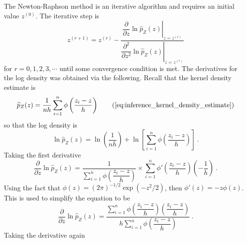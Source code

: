 The Newton-Raphson method is an iterative algorithm and requires an initial value $z^{(0)}$. The iterative step is
\begin{equation}
  z^{(r+1)} =
  z^{(r)}
  -\dfrac{
    \left.
      \dfrac{
        \partial
      }
      {
        \partial z
      }
      \ln\widehat{p}_Z(z)
    \right|_{z = z^{(r)}}
  }
  {
    \left.
      \dfrac{
        \partial^2
      }
      {
        \partial z^2
      }
      \ln\widehat{p}_Z(z)
    \right|_{z = z^{(r)}}
  } 
\end{equation}
for $r=0,1,2,3,\cdots$ until some convergence condition is met. The derivatives for the log density was obtained via the following. Recall that the kernel density estimate is
\begin{equation}
  \widehat{p}_Z(z)=
  \frac{1}{nh}
  \sum_{i=1}^n\phi\left(
    \dfrac{z_i-z}{h}
  \right)
  \tag{\ref{eq:inference_kernel_density_estimate}}
\end{equation}
so that the log density is
\begin{equation}
  \ln\widehat{p}_Z(z)=
  \ln\left(
    \dfrac{1}{nh}
  \right)
  +
  \ln\left[
    \sum_{i=1}^n
    \phi\left(
      \dfrac{
        z_i - z
      }
      {
        h
      }
    \right)
  \right]
  \ .
\end{equation}
Taking the first derivative
\begin{equation}
  \dfrac{
    \partial
  }
  {
    \partial z
  }
  \ln\widehat{p}_Z(z)
  =
  \dfrac{
    1
  }
  {
    \sum_{i=1}^n
    \phi\left(
      \dfrac{
        z_i - z
      }
      {
        h
      }
    \right)
  }
  \times
  \sum_{i=1}^n
  \phi'\left(
    \dfrac{
      z_i - z
    }
    {
      h
    }
  \right)
  \left(
    -\dfrac{
      1
    }
    {
      h
    }
  \right)
  \ .
\end{equation}
Using the fact that $\phi(z)=(2\pi)^{-1/2}\exp(-z^2/2)$, then $\phi'(z)=-z\phi(z)$. This is used to simplify the equation to be
\begin{equation}
  \dfrac{
    \partial
  }
  {
    \partial z
  }
  \ln\widehat{p}_Z(z)
  =
  \dfrac{
    \sum_{i=1}^n
    \phi\left(
      \dfrac{
        z_i - z
      }
      {
        h
      }
    \right)
    \left(
      \dfrac{
        z_i - z
      }
      {
        h
      }
    \right)
  }
  {
    h
    \sum_{i=1}^n
    \phi\left(
      \dfrac{
        z_i - z
      }
      {
        h
      }
    \right)
  }
  \ .
\end{equation}
Taking the derivative again
